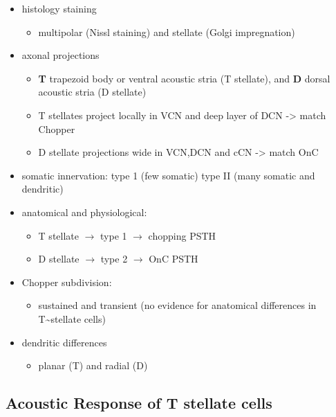 \begin{itemize}
\item histology staining
\begin{itemize}
\item multipolar (Nissl staining) and stellate (Golgi impregnation) \citep{Osen:1969,BrawerMorestEtAl:1974,Lorente:1981}
\end{itemize}
\item axonal projections
\begin{itemize}
\item \textbf{T} trapezoid body or ventral acoustic stria (T stellate), and \textbf{D} dorsal acoustic stria (D stellate) \citep{OertelWuEtAl:1990}
\item T stellates project locally in VCN and deep layer of DCN -> match Chopper \citep{RhodeOertelEtAl:1983,SmithRhode:1989}
\item D stellate projections wide in VCN,DCN and cCN -> match OnC  \citep{SmithRhode:1989}
\end{itemize}
\item somatic innervation: type 1 (few somatic) type II (many somatic and dendritic) \citep{Cant:1981}
\item anatomical and physiological: \citet{SmithRhode:1989}
\begin{itemize}
\item T stellate $\rightarrow$ type 1 $\rightarrow$ chopping PSTH
\item D stellate $\rightarrow$ type 2 $\rightarrow$ OnC PSTH
\end{itemize}
\item Chopper subdivision:
\begin{itemize}
\item sustained and transient (no evidence for anatomical differences in T\~{}stellate cells)
\end{itemize}
\item dendritic differences \citep{DoucetRyugo:1997,DoucetRyugo:2006}
\begin{itemize}
\item planar (T) and radial (D)
\end{itemize}
\end{itemize}

\subsection{Acoustic Response of T stellate cells}
\label{sec-1_2}



